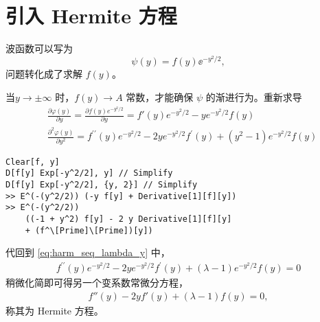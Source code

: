 \section{引入 Hermite 方程}
波函数可以写为
\begin{equation}
    \psi(y) = f(y) \ee^{-y^2/2},
\end{equation}
问题转化成了求解 $f(y)$。

当$y\rightarrow\pm\infty$ 时，$f(y) \rightarrow A$ 常数，才能确保 $\psi$ 的渐进行为。重新求导 
\begin{align}
    &\frac{\partial \varphi(y)}{\partial y}=\frac{\partial f(y) e^{-y^2/2}}{\partial y}=f'(y) e^{-y^2 / 2}-y e^{-y^2 / 2} f(y) \\
    &\frac{\partial^2 \varphi(y)}{\partial y^2}=f^{\prime \prime}(y) e^{-y^2 / 2}-2 y e^{-y^2 / 2} f^{\prime}(y)+\left(y^2-1\right) e^{-y^2 / 2} f(y)
\end{align}
\begin{lstlisting}
Clear[f, y]
D[f[y] Exp[-y^2/2], y] // Simplify
D[f[y] Exp[-y^2/2], {y, 2}] // Simplify
>> E^(-(y^2/2)) (-y f[y] + Derivative[1][f][y])
>> E^(-(y^2/2)) 
    ((-1 + y^2) f[y] - 2 y Derivative[1][f][y] 
    + (f^\[Prime]\[Prime])[y])
\end{lstlisting}
代回到 \eqref{eq:harm_seq_lambda_y} 中，
\begin{align}
    f^{\prime \prime}(y) e^{-y^2 / 2}-2 y e^{-y^2 / 2} f^{\prime}(y)+(\lambda-1) e^{-y^2 / 2} f(y)=0
\end{align}
稍微化简即可得另一个变系数常微分方程，
\begin{align}
    f''(y) - 2y f'(y) + (\lambda - 1) f(y) = 0, 
    \label{eq:harm_lambda_y_simp} %
\end{align}
称其为 Hermite 方程。


